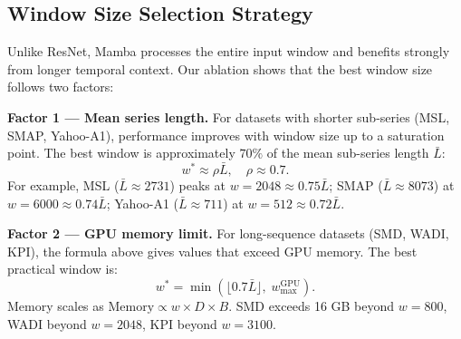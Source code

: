 \documentclass[runningheads]{llncs}
\begin{document}
\begin{table}[htbp]
\centering
\caption{Key hyperparameters (final configuration).}
\label{tab:hyperparams}
\end{table}

\subsection{Window Size Selection Strategy}
\label{sec:window_selection}

Unlike ResNet, Mamba processes the entire input window and benefits strongly from longer temporal context. Our ablation shows that the best window size follows two factors:

\textbf{Factor 1 --- Mean series length.} For datasets with shorter sub-series (MSL, SMAP, Yahoo-A1), performance improves with window size up to a saturation point. The best window is approximately $70\%$ of the mean sub-series length $\bar{L}$:
\[
w^* \approx \rho\bar{L}, \quad \rho \approx 0.7.
\]
For example, MSL ($\bar{L}\approx2731$) peaks at $w=2048\approx0.75\bar{L}$; SMAP ($\bar{L}\approx8073$) at $w=6000\approx0.74\bar{L}$; Yahoo-A1 ($\bar{L}\approx711$) at $w=512\approx0.72\bar{L}$.

\textbf{Factor 2 --- GPU memory limit.} For long-sequence datasets (SMD, WADI, KPI), the formula above gives values that exceed GPU memory. The best practical window is:
\[
w^* = \min\!\left(\lfloor 0.7\bar{L} \rfloor,\; w_{\max}^{\text{GPU}}\right).
\]
Memory scales as $\text{Memory} \propto w \times D \times B$. SMD exceeds 16 GB beyond $w=800$, WADI beyond $w=2048$, KPI beyond $w=3100$.
\end{document}
